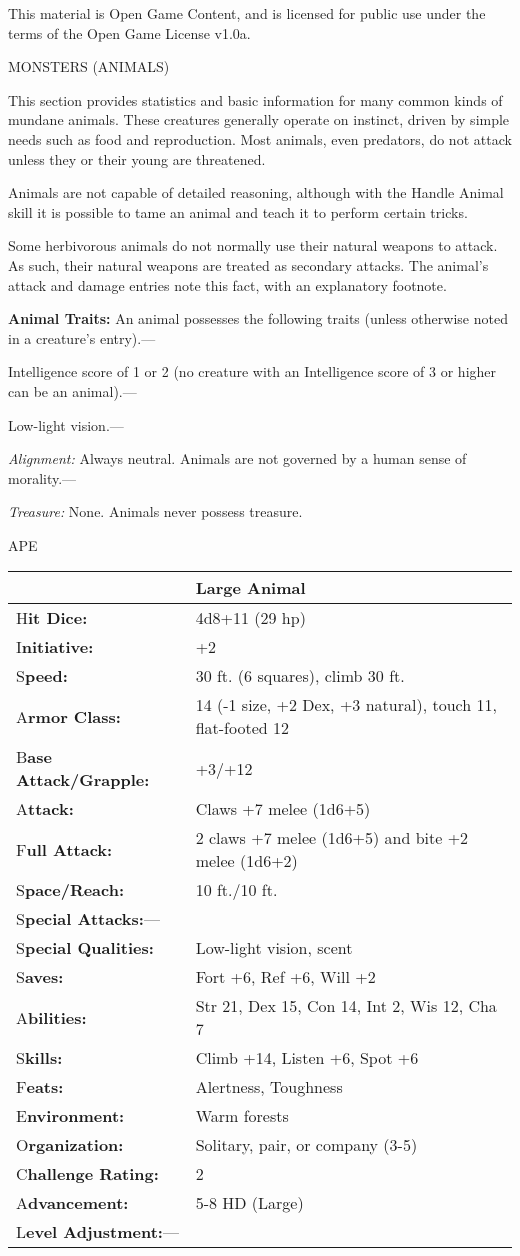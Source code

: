 \documentclass{article}
\begin{document}
This material is Open Game Content, and is licensed for public use under the terms 
of the Open Game License v1.0a.

{\LARGE{}MONSTERS (ANIMALS)}

\vspace{12pt}
This section provides statistics and basic information for many common kinds of 
mundane animals. These creatures generally operate on instinct, driven by simple 
needs such as food and reproduction. Most animals, even predators, do not attack 
unless they or their young are threatened.

Animals are not capable of detailed reasoning, although with the Handle Animal 
skill it is possible to tame an animal and teach it to perform certain tricks.

Some herbivorous animals do not normally use their natural weapons to attack. As 
such, their natural weapons are treated as secondary attacks. The animal's attack 
and damage entries note this fact, with an explanatory footnote.

\vspace{12pt}
\textbf{Animal Traits:} An animal possesses the following traits (unless otherwise 
noted in a creature's entry).---

Intelligence score of 1 or 2 (no creature with an Intelligence score of 3 or higher 
can be an animal).---

Low-light vision.---

\textit{Alignment: }Always neutral. Animals are not governed by a human sense of 
morality.---

\textit{Treasure: }None. Animals never possess treasure.

\vspace{12pt}
APE

\begin{tabular}{|>{\raggedright}p{91pt}|>{\raggedright}p{226pt}|}
\hline
  & Large Animal\tabularnewline
\hline
H\textbf{it Dice:} & 4d8+11 (29 hp)\tabularnewline
\hline
I\textbf{nitiative:} & +2\tabularnewline
\hline
S\textbf{peed:} & 30 ft. (6 squares), climb 30 ft.\tabularnewline
\hline
A\textbf{rmor Class:} & 14 (-1 size, +2 Dex, +3 natural), touch 11, flat-footed 
12\tabularnewline
\hline
B\textbf{ase Attack/Grapple:} & +3/+12\tabularnewline
\hline
A\textbf{ttack:} & Claws +7 melee (1d6+5)\tabularnewline
\hline
F\textbf{ull Attack:} & 2 claws +7 melee (1d6+5) and bite +2 melee (1d6+2)\tabularnewline
\hline
S\textbf{pace/Reach:} & 10 ft./10 ft.\tabularnewline
\hline
S\textbf{pecial Attacks:}--- & \tabularnewline
\hline
S\textbf{pecial Qualities:} & Low-light vision, scent\tabularnewline
\hline
S\textbf{aves:} & Fort +6, Ref +6, Will +2\tabularnewline
\hline
A\textbf{bilities:} & Str 21, Dex 15, Con 14, Int 2, Wis 12, Cha 7\tabularnewline
\hline
S\textbf{kills:} & Climb +14, Listen +6, Spot +6\tabularnewline
\hline
F\textbf{eats:} & Alertness, Toughness\tabularnewline
\hline
E\textbf{nvironment:} & Warm forests\tabularnewline
\hline
O\textbf{rganization:} & Solitary, pair, or company (3-5)\tabularnewline
\hline
C\textbf{hallenge Rating:} & 2\tabularnewline
\hline
A\textbf{dvancement:} & 5-8 HD (Large)\tabularnewline
\hline
L\textbf{evel Adjustment:}--- & \tabularnewline
\hline
\end{tabular}
\end{document}
